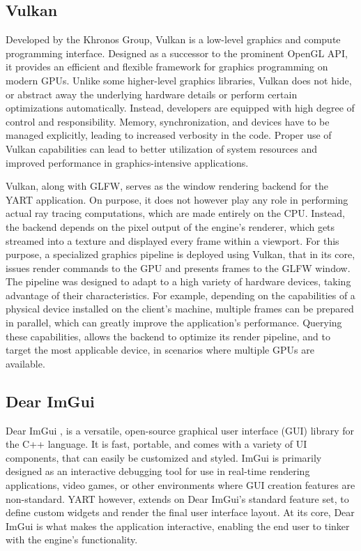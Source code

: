 \subsection{Vulkan}

Developed by the Khronos Group, Vulkan \supercite{Sellers2016} is a low-level graphics and compute programming interface.
Designed as a successor to the prominent OpenGL API, it provides an efficient and flexible framework for graphics programming on modern GPUs.
Unlike some higher-level graphics libraries, Vulkan does not hide, or abstract away the underlying hardware details or perform certain optimizations automatically. 
Instead, developers are equipped with high degree of control and responsibility.
Memory, synchronization, and devices have to be managed explicitly, leading to increased verbosity in the code.
Proper use of Vulkan capabilities can lead to better utilization of system resources and improved performance in graphics-intensive applications.

Vulkan, along with GLFW, serves as the window rendering backend for the YART application.
On purpose, it does not however play any role in performing actual ray tracing computations, which are made entirely on the CPU. 
Instead, the backend depends on the pixel output of the engine's renderer, which gets streamed into a texture and displayed every frame within a viewport.
For this purpose, a specialized graphics pipeline is deployed using Vulkan, that in its core, issues render commands to the GPU and presents frames to the GLFW window. The pipeline was designed to adapt to a high variety of hardware devices, taking advantage of their characteristics.
For example, depending on the capabilities of a physical device installed on the client's machine, multiple frames can be prepared in parallel, which can greatly improve the application's performance.
Querying these capabilities, allows the backend to optimize its render pipeline, and to target the most applicable device, in scenarios where multiple GPUs are available.

\subsection{Dear ImGui}

Dear ImGui \supercite{DearImGui}, is a versatile, open-source graphical user interface (GUI) library for the C++ language. 
It is fast, portable, and comes with a variety of UI components, that can easily be customized and styled.
ImGui is primarily designed as an interactive debugging tool for use in real-time rendering applications, video games, or other environments where GUI creation features are non-standard.
YART however, extends on Dear ImGui's standard feature set, to define custom widgets and render the final user interface layout. 
At its core, Dear ImGui is what makes the application interactive, enabling the end user to tinker with the engine's functionality.

